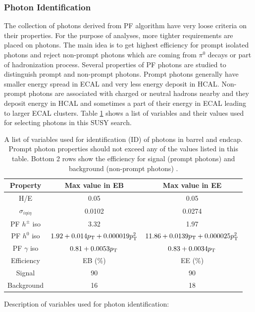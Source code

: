\subsubsection{Photon Identification}
\label{sec:photonID}
The collection of photons derived from PF algorithm have very loose criteria on their properties. For the purpose of analyses, more 
tighter requirements are placed on photons. The main idea is to get highest efficiency for prompt isolated photons and reject non-prompt 
photons which are coming from $\pi^0$ decays or part of hadronization process. Several properties of PF photons are studied to distinguish 
prompt and non-prompt photons. Prompt photons generally have smaller energy spread in ECAL and very less energy deposit in HCAL. 
Non-prompt photons are associated with charged or neutral hadrons nearby and they deposit energy in HCAL and sometimes a part of their 
energy in ECAL leading to larger ECAL clusters. Table \ref{tab:photonID} shows a list of variables and their values used for selecting 
photons in this SUSY search.
\begin{table}[h!]
\centering
\captionsetup{width=.99\linewidth}
\caption[Photon Identification ]{A list of variables used for identification (ID) of photons in barrel and endcap. Prompt photon 
properties should not exceed any of the values listed in this table. Bottom 2 rows show the efficiency for signal (prompt photons) and 
background (non-prompt photons) \cite{EGamPho}.}
\label{tab:photonID}
\begin{tabular}{c|c|c}
\hline
Property		&	Max value in EB		&	Max value in EE\\\hline\hline
H/E					&	0.05				&	0.05\\
$\sigma_{i\eta i\eta}$&	0.0102				&	0.0274\\
PF $h^\pm$ iso	&	3.32		&	1.97\\
PF $h^0$ iso	&	$1.92 + 0.014p_{\mathrm{T}} + 0.000019p_{\mathrm{T}}^2$	&	$11.86 + 0.0139p_{\mathrm{T}}+0.000025p_{\mathrm{T}}^2$\\
PF $\gamma$ iso	&	$0.81 + 0.0053p_{\mathrm{T}}$	&	$0.83 + 0.0034p_{\mathrm{T}}$\\\hline\hline
Efficiency		&	EB (\%)			&	EE (\%) \\\hline
Signal			&	90					&	90 \\
Background		&	16					&	18\\\hline
\end{tabular}
\end{table}
Description of variables used for photon identification:
